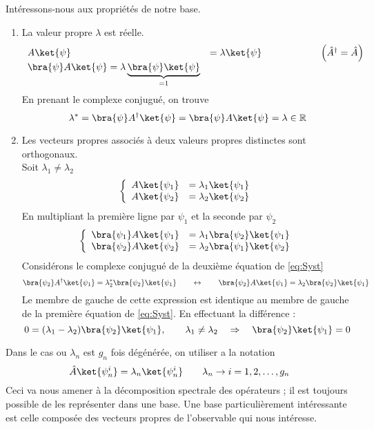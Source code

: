Intéressons-nous aux propriétés de notre base.
\begin{enumerate}
\item La valeur propre $\lambda$ est réelle.
\begin{equation}
\begin{array}{ll}
A\ket{\psi} &= \lambda \ket{\psi}\qquad\qquad\qquad \left(\hat{A}^\dagger = 
\hat{A}\right)\\
\bra{\psi}A\ket{\psi} = \lambda\underbrace{\bra{\psi}\ket{\psi}}_{=1}
\end{array}
\end{equation}
En prenant le complexe conjugué, on trouve
\begin{equation}
\lambda^* = \bra{\psi}A^\dagger\ket{\psi} = \bra{\psi}A\ket{\psi}=\lambda\in
\mathbb{R}
\end{equation}
\item Les vecteurs propres associés à deux valeurs propres distinctes sont 
orthogonaux.\\
Soit $\lambda_1\neq\lambda_2$
\begin{equation}
\left\{\begin{array}{ll}
A\ket{\psi_1} &=\lambda_1\ket{\psi_1}\\
A\ket{\psi_2} &=\lambda_2\ket{\psi_2}
\end{array}\right.
\end{equation}
En multipliant la première ligne par $\psi_1$ et la seconde par $\psi_2$
\begin{equation}
\left\{\begin{array}{ll}
\bra{\psi_1}A\ket{\psi_1} &=\lambda_1\bra{\psi_2}\ket{\psi_1}\\
\bra{\psi_2}A\ket{\psi_2} &=\lambda_2\bra{\psi_1}\ket{\psi_2}
\end{array}\right.
\label{eq:Syst}
\end{equation}
Considérons le complexe conjugué de la deuxième équation de \autoref{eq:Syst} 
\begin{equation}
\bra{\psi_2}A^\dagger\ket{\psi_1} = \lambda_2^*\bra{\psi_2}\ket{\psi_1}\qquad
\leftrightarrow
\qquad\bra{\psi_2}A\ket{\psi_1} = \lambda_2\bra{\psi_2}\ket{\psi_1}
\end{equation}
Le membre de gauche de cette expression est identique au membre de gauche de 
la première équation de \autoref{eq:Syst}. En effectuant la différence :
\begin{equation}
0 = (\lambda_1-\lambda_2)\bra{\psi_2}\ket{\psi_1},\qquad \lambda_1\neq\lambda_2 
\quad\Rightarrow\quad \bra{\psi_2}\ket{\psi_1} = 0
\end{equation}
\end{enumerate}
Dans le cas ou $\lambda_n$ est $g_n$ fois dégénérée, on utiliser a la notation
\begin{equation}
\hat{A}\ket{\psi_n^i} = \lambda_n\ket{\psi_n^i}\qquad \lambda_n \rightarrow i=
1,2,\dots, g_n
\end{equation}
Ceci va nous amener à la décomposition spectrale des opérateurs ; il est 
toujours possible de les représenter dans une base. Une base particulièrement 
intéressante est celle composée des vecteurs propres de l'observable qui nous 
intéresse.

